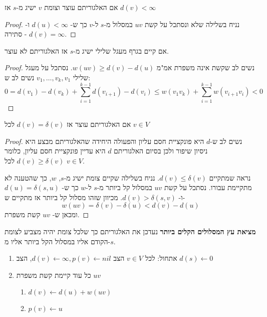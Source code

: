 \begin{claim}
אם האלגוריתם עוצר וצומת $v$ ישיג מ-$s$ אז 
$d(v) < \infty$
\end{claim}
\begin{proof}
נניח בשלילה שלא ונסתכל על קשת
$uv$
במסלול מ-$s$ ל-$v$ כך ש-%
$d(u) < \infty$
ו-%
$d(v) = \infty$
- סתירה.
\end{proof}



\begin{claim}
אם קיים בגרף מעגל שלילי ישיג מ-$s$ אז האלגוריתם לא עוצר.
\end{claim}
\begin{proof}
נשים לב שקשת אינה משפרת אמ"מ 
$w(uv) \geq d(v) - d(u)$.
נסתכל על מעגל שלילי
$v_1, \ldots, v_k, v_1$
נשים לב ש:
$$
0 = 
d(v_1) - d(v_k) + \sum_{i=1}^{k-1} d(v_{i + 1}) - d(v_{i})
\leq
w(v_1v_k) + \sum_{i=1}^{k-1} w(v_{i+1}v_i) < 0
$$
\end{proof}



\begin{claim}
אם האלגוריתם עוצר אז 
$d(v) = \delta(v)$
לכל
$v \in V$
\end{claim}
\begin{proof}
נשים לב ש-$d$ היא פונקציית חסם עליון והפעולה היחידה שהאלגוריתם מבצע היא ניסיון שיפור ולכן
בסיום האלגוריתם $d$ היא עדיין פונקציית חסם עליון, כלומר 
$d(v) \geq \delta(v)$
לכל
$v \in V$.

נראה שמתקיים 
$d(v) \leq \delta(v)$.
נניח בשלילה שקיים צומת ישיג מ-$s$,
$w$,
כך שהטענה לא מתקיימת עבורו.
נסתכל על קשת 
$uv$
במסלול קל ביותר מ-$s$ ל-$w$
כך ש-%
$d(u) = \delta(s,u)$
ו-%
$d(v) > \delta(s,v)$.
מכיוון שזהו מסלול קל ביותר אז מתקיים ש-%
$$w(uv) = \delta(v) - \delta(u) < d(v) - d(u)$$
ומכאן ש-%
$uv$
קשת משפרת.

\end{proof}

\textbf{מציאת עץ המסלולים הקלים ביותר}
נעדכן את האלגוריתם כך שלכל צומת יהיה מצביע לצומת הקודם אליו במסלול הקל ביותר אליו מ-$s$.

\begin{enumerate}
\item
אתחול:
לכל 
$v \in V$
הצב
$d(v) \leftarrow \infty, p(v) \leftarrow nil$,
הצב
$d(s) \leftarrow 0$
\item
כל עוד קיימת קשת משפרת 
$uv$
\begin{enumerate}
\item
$d(v) \leftarrow d(u) + w(uv)$
\item
$p(v) \leftarrow u$
\end{enumerate}
\end{enumerate}

